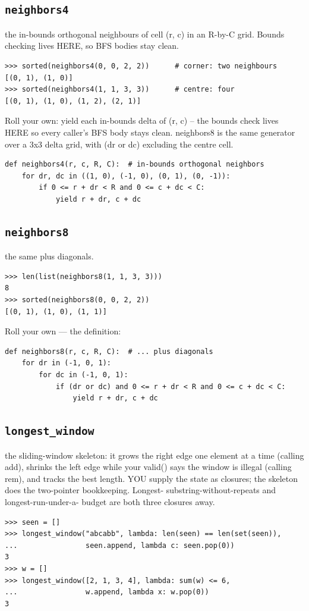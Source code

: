 \documentclass[10pt,letterpaper]{book}
\begin{document}
\subsection{\texttt{neighbors4}}\label{def:neighbors4}
the in-bounds orthogonal neighbours of cell (r, c) in an R-by-C grid. Bounds checking lives HERE, so BFS bodies stay clean.
\begin{lstlisting}[style=ex]
>>> sorted(neighbors4(0, 0, 2, 2))      # corner: two neighbours
[(0, 1), (1, 0)]
>>> sorted(neighbors4(1, 1, 3, 3))      # centre: four
[(0, 1), (1, 0), (1, 2), (2, 1)]
\end{lstlisting}

Roll your own: yield each in-bounds delta of (r, c) -- the bounds check lives HERE so every caller's BFS body stays clean. neighbors8 is the same generator over a 3x3 delta grid, with (dr or dc) excluding the centre cell.

\begin{lstlisting}[style=ex]
def neighbors4(r, c, R, C):  # in-bounds orthogonal neighbors
    for dr, dc in ((1, 0), (-1, 0), (0, 1), (0, -1)):
        if 0 <= r + dr < R and 0 <= c + dc < C:
            yield r + dr, c + dc
\end{lstlisting}
\subsection{\texttt{neighbors8}}\label{def:neighbors8}
the same plus diagonals.
\begin{lstlisting}[style=ex]
>>> len(list(neighbors8(1, 1, 3, 3)))
8
>>> sorted(neighbors8(0, 0, 2, 2))
[(0, 1), (1, 0), (1, 1)]
\end{lstlisting}

Roll your own --- the definition:

\begin{lstlisting}[style=ex]
def neighbors8(r, c, R, C):  # ... plus diagonals
    for dr in (-1, 0, 1):
        for dc in (-1, 0, 1):
            if (dr or dc) and 0 <= r + dr < R and 0 <= c + dc < C:
                yield r + dr, c + dc
\end{lstlisting}
\subsection{\texttt{longest\_window}}\label{def:longest-window}
the sliding-window skeleton: it grows the right edge one element at a time (calling add), shrinks the left edge while your valid() says the window is illegal (calling rem), and tracks the best length. YOU supply the state as closures; the skeleton does the two-pointer bookkeeping. Longest- substring-without-repeats and longest-run-under-a- budget are both three closures away.
\begin{lstlisting}[style=ex]
>>> seen = []
>>> longest_window("abcabb", lambda: len(seen) == len(set(seen)),
...                seen.append, lambda c: seen.pop(0))
3
>>> w = []
>>> longest_window([2, 1, 3, 4], lambda: sum(w) <= 6,
...                w.append, lambda x: w.pop(0))
3
\end{lstlisting}
\end{document}
